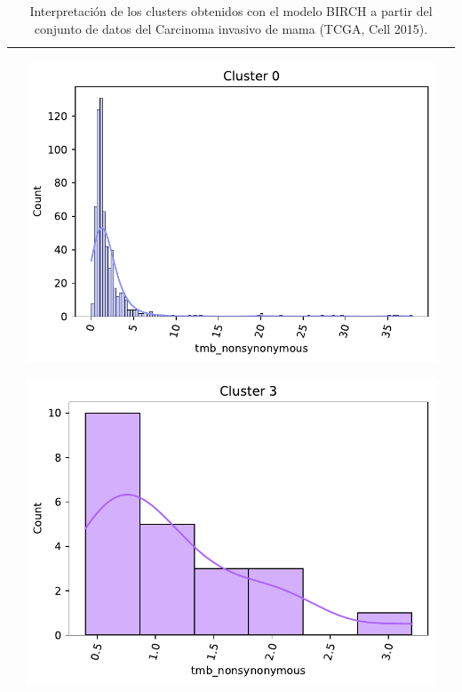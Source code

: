 \begin{table}
\begin{threeparttable}
\begin{tabular}{p{2.5cm} p{7cm} p{6.5cm}}
			& 
			\begin{center}\includegraphics[width=1\linewidth]{NOTEBOOK/IMAGENES_BIRCH_CLUSTERING/10_Cluster_0_tmb_nonsynonymous}\end{center}
			\begin{center}\includegraphics[width=1\linewidth]{NOTEBOOK/IMAGENES_BIRCH_CLUSTERING/10_Cluster_3_tmb_nonsynonymous}\end{center}
			
			\\ \hline
		\end{tabular}
		\caption{Interpretación de los clusters obtenidos con el modelo BIRCH a partir del conjunto de datos del Carcinoma invasivo de mama (TCGA, Cell 2015).}
		\label{interpretacion_BIRCH}
	\end{threeparttable}
\end{table}
\clearpage
